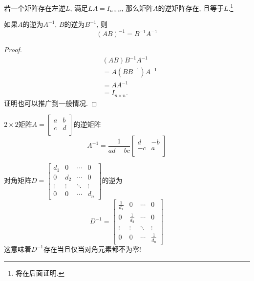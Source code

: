 \begin{proposition}
    若一个矩阵存在左逆$L$, 满足$LA = I_{n \times n}$, 那么矩阵$A$的逆矩阵存在, 且等于$L$.\footnote{将在后面证明.}
\end{proposition}

\begin{proposition}
    如果$A$的逆为$A^{-1}$, $B$的逆为$B^{-1}$, 则
    \begin{equation}
      (AB)^{-1} = B^{-1} A^{-1}
    \end{equation}
\end{proposition}
\begin{proof}
    \begin{equation}
      \begin{aligned}
        &(AB)B^{-1}A^{-1}
        \\
        & = A(B B^{-1})A^{-1}
        \\
        & = A A^{-1}
        \\
        & = I_{n \times n} .
      \end{aligned}
    \end{equation}
    证明也可以推广到一般情况.
\end{proof}

\begin{proposition}
    $2\times 2$矩阵$A = \begin{bmatrix}
     a & b\\
     c & d\\
    \end{bmatrix}$的逆矩阵
    \begin{equation}
      A^{-1} = \frac{1}{ad -bc} \begin{bmatrix}
       d & -b\\
       -c & a\\
      \end{bmatrix}
    \end{equation}
\end{proposition}

\begin{proposition}
    对角矩阵$D = \begin{bmatrix}
        d_1&0&\cdots&0\\
        0&d_2&\cdots&0\\
        \vdots&\vdots&\ddots&\vdots\\
        0&0&\cdots&d_n
    \end{bmatrix}$的逆为
    \begin{equation}
      D^{-1}
      =
      \begin{bmatrix}
        \frac{1}{d_1}&0&\cdots&0\\
        0&\frac{1}{d_2}&\cdots&0\\
        \vdots&\vdots&\ddots&\vdots\\
        0&0&\cdots&\frac{1}{d_n}
      \end{bmatrix}
    \end{equation}
    这意味着$D^{-1}$存在当且仅当对角元素都不为零!
\end{proposition}

